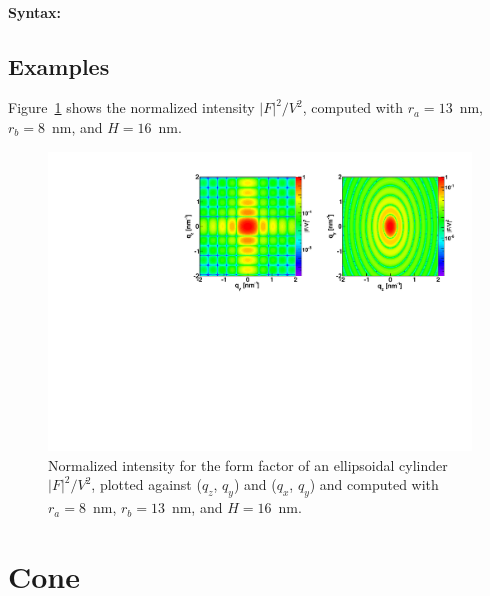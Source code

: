 \paragraph{Syntax:} 

\newpage


\subsection{Examples}
Figure~\ref{fig:FFellipscylinderEx} shows the normalized intensity
$|F|^2/V^2$, computed with $r_a=13$~nm, $r_b=8$~nm, and $H=16$~nm.
\begin{figure}[h]
\begin{center}
\includegraphics[width=\textwidth]{Figures/figffellipscylinder}
\end{center}
\caption{Normalized intensity for the form factor of an ellipsoidal
  cylinder $|F|^2/V^2$, plotted against ($q_z$, $q_y$) and ($q_x$,
  $q_y$) and computed with $r_a=8$~nm, $r_b=13$~nm, and $H=16$~nm.}
\label{fig:FFellipscylinderEx}
\end{figure}



\newpage{\cleardoublepage}
\section{Cone}  

